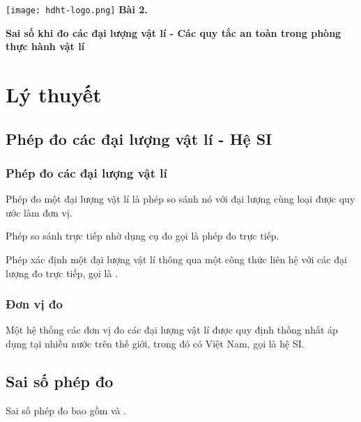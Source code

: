 \newcommand{\chapter}[2][]{
	\newcommand{\chapname}{#2}
	\begin{flushleft}
		\begin{minipage}[t]{\linewidth}
			\texttt{[image: hdht-logo.png]}
			\hspace{0pt}	
			\sffamily\bfseries\large Bài  2.
			\begin{flushleft}
				\huge\bfseries #1
			\end{flushleft}
		\end{minipage}
	\end{flushleft}
	\vspace{1cm}
	\normalfont\normalsize
}
\chapter[Sai số khi đo các đại lượng vật lí - Các quy tắc an toàn trong phòng thực hành vật lí]{Sai số khi đo các đại lượng vật lí - Các quy tắc an toàn trong phòng thực hành vật lí}
\section{Lý thuyết}
	\subsection{Phép đo các đại lượng vật lí - Hệ SI}
\subsubsection{Phép đo các đại lượng vật lí}
Phép đo một đại lượng vật lí là phép so sánh nó với đại lượng cùng loại được quy ước làm đơn vị.

Phép so sánh trực tiếp nhờ dụng cụ đo gọi là phép đo trực tiếp.

Phép xác định một đại lượng vật lí thông qua một công thức liên hệ với các đại lượng đo trực tiếp, gọi là .
\subsubsection{Đơn vị đo}
Một hệ thống các đơn vị đo các đại lượng vật lí được quy định thống nhất áp dụng tại nhiều nước trên thế giới, trong đó có Việt Nam, gọi là hệ SI.
\subsection{Sai số phép đo}
Sai số phép đo bao gồm  và .
